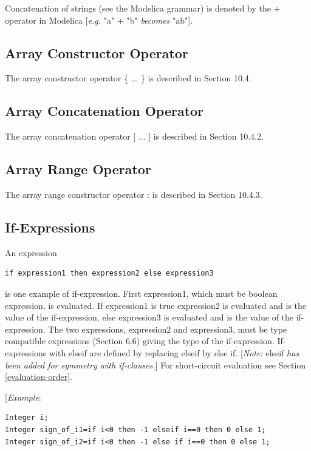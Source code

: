 \documentclass[10pt,a4paper]{report}
\begin{document}
Concatenation of strings (see the Modelica grammar) is denoted by the +
operator in Modelica {[}\emph{e.g.} "a" + "b" \emph{becomes} "ab"{]}.

\subsection{Array Constructor Operator}

The array constructor operator \{ ... \} is described in Section 10.4.

\subsection{Array Concatenation Operator}

The array concatenation operator {[} ... {]} is described in Section
10.4.2.

\subsection{Array Range Operator}
The array range constructor operator : is described in Section 10.4.3.

\subsection{If-Expressions}

An expression
\begin{lstlisting}[language=modelica]
if expression1 then expression2 else expression3
\end{lstlisting}

is one example of if-expression. First expression1, which must be
boolean expression, is evaluated. If expression1 is true expression2 is
evaluated and is the value of the if-expression, else expression3 is
evaluated and is the value of the if-expression. The two expressions,
expression2 and expression3, must be type compatible expressions
(Section 6.6) giving the type of the if-expression. If-expressions with
elseif are defined by replacing elseif by else if. {[}\emph{Note:}
elseif \emph{has been added for symmetry with if-clauses.}{]} For
short-circuit evaluation see Section \ref{evaluation-order}.

{[}\emph{Example}:

\begin{lstlisting}[language=modelica]
Integer i;
Integer sign_of_i1=if i<0 then -1 elseif i==0 then 0 else 1;
Integer sign_of_i2=if i<0 then -1 else if i==0 then 0 else 1;
\end{lstlisting}
\end{document}
